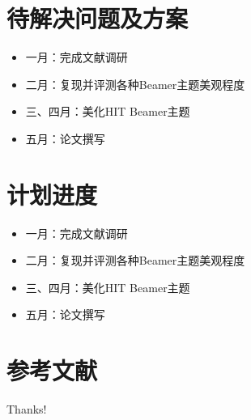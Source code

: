 \documentclass{beamer}
\begin{document}
\section{待解决问题及方案}
\begin{frame}
    \begin{itemize}
        \item 一月：完成文献调研
        \item 二月：复现并评测各种Beamer主题美观程度
        \item 三、四月：美化HIT Beamer主题
        \item 五月：论文撰写
    \end{itemize}
    \nocite{*}
\end{frame}


\section{计划进度}
\begin{frame}
    \begin{itemize}
        \item 一月：完成文献调研
        \item 二月：复现并评测各种Beamer主题美观程度
        \item 三、四月：美化HIT Beamer主题
        \item 五月：论文撰写
    \end{itemize}
    \nocite{*}
\end{frame}


\section{参考文献}

\begin{frame}[allowframebreaks]
    \tiny
    
\end{frame}
 
\begin{frame}
    \begin{center}
        {\Huge\calligra Thanks!}
    \end{center}
\end{frame}
\end{document}
